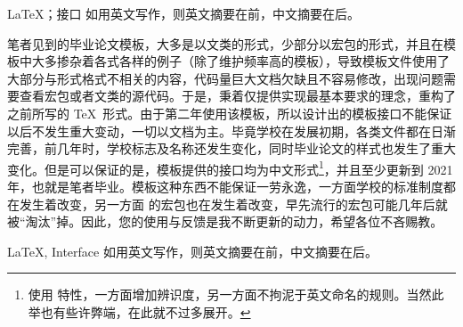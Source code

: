 \begin{中文摘要}{\LaTeX ；接口}
  如用英文写作，则英文摘要在前，中文摘要在后。

  笔者见到的毕业论文模板，大多是以文类的形式，少部分以宏包的形式，并且在模板中大多掺杂着各式各样的例子（除了维护频率高的模板），导致模板文件使用了大部分与形式格式不相关的内容，代码量巨大文档欠缺且不容易修改，出现问题需要查看宏包或者文类的源代码。于是，秉着仅提供实现最基本要求的理念，重构了之前所写的 \TeX\ 形式。由于第二年使用该模板，所以设计出的模板接口不能保证以后不发生重大变动，一切以文档为主。毕竟学校在发展初期，各类文件都在日渐完善，前几年时，学校标志及名称还发生变化，同时毕业论文的样式也发生了重大变化。但是可以保证的是，模板提供的接口均为中文形式\footnote{使用  特性，一方面增加辨识度，另一方面不拘泥于英文命名的规则。当然此举也有些许弊端，在此就不过多展开。}，并且至少更新到 2021 年，也就是笔者毕业。模板这种东西不能保证一劳永逸，一方面学校的标准制度都在发生着改变，另一方面  的宏包也在发生着改变，早先流行的宏包可能几年后就被“淘汰”掉。因此，您的使用与反馈是我不断更新的动力，希望各位不吝赐教。
\end{中文摘要}

\begin{英文摘要}{LaTeX, Interface}
  如用英文写作，则英文摘要在前，中文摘要在后。

  \lipsum[1]
\end{英文摘要}
\cleardoublepage

